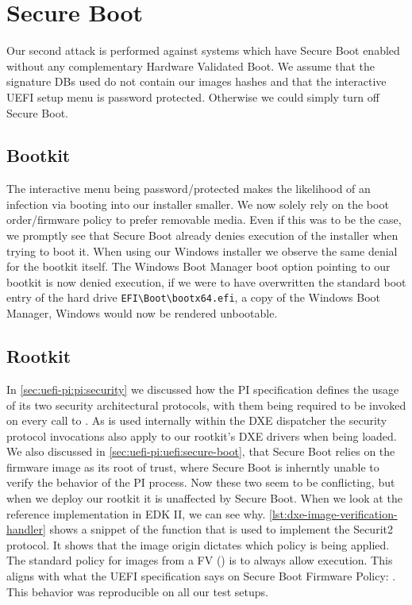 
\section{Secure Boot}
\label{sec:attacks:secure-boot}

Our second attack is performed against systems which have Secure Boot enabled without any complementary Hardware Validated Boot.
We assume that the signature \acp{DB} used do not contain our images hashes and that the interactive \ac{UEFI} setup menu is password protected.
Otherwise we could simply turn off Secure Boot.

\subsection{Bootkit}

The interactive menu being password\-/protected makes the likelihood of an infection via booting into our installer smaller.
We now solely rely on the boot order/firmware policy to prefer removable media.
Even if this was to be the case, we promptly see that Secure Boot already denies execution of the installer when trying to boot it.
When using our Windows installer we observe the same denial for the bootkit itself.
The Windows Boot Manager boot option pointing to our bootkit is now denied execution, if we were to have overwritten the standard boot entry of the hard drive \lstinline{EFI\Boot\bootx64.efi}, a copy of the Windows Boot Manager, Windows would now be rendered unbootable.

\subsection{Rootkit}

In \autoref{sec:uefi-pi:pi:security} we discussed how the \ac{PI} specification defines the usage of its two security architectural protocols, with them being required to be invoked on every call to .
As  is used internally within the \ac{DXE} dispatcher the security protocol invocations also apply to our rootkit's \ac{DXE} drivers when being loaded.
We also discussed in \autoref{sec:uefi-pi:uefi:secure-boot}, that Secure Boot relies on the firmware image as its root of trust, where Secure Boot is inherntly unable to verify the behavior of the \ac{PI} process.
Now these two seem to be conflicting, but when we deploy our rootkit it is unaffected by Secure Boot.
When we look at the reference implementation in \ac{EDK} II, we can see why.
\autoref{lst:dxe-image-verification-handler} shows a snippet of the function that is used to implement the Securit2 protocol.
It shows that the image origin dictates which policy is being applied.
The standard policy for images from a \acf{FV} () is to always allow execution.
This aligns with what the \ac{UEFI} specification says on Secure Boot Firmware Policy:
.
This behavior was reproducible on all our test setups.



\clearpage